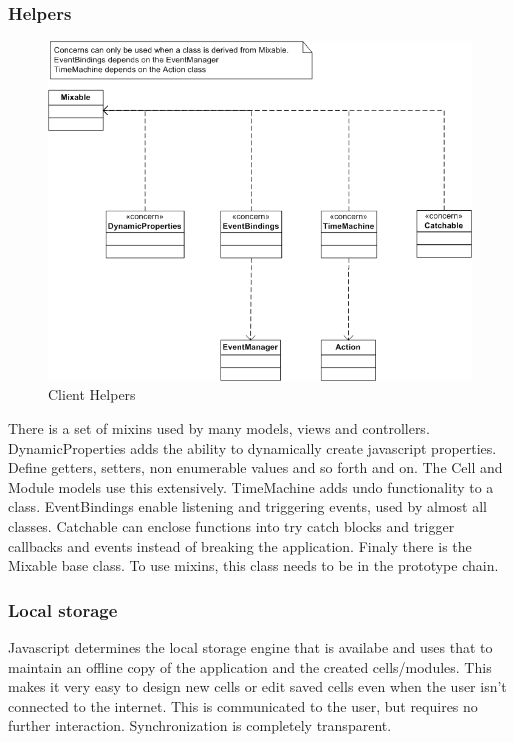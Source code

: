 \documentclass{report}
\begin{document}
				\subsubsection{Helpers}
					\begin{figure}[htb]
						\begin{center}
							\includegraphics[width=\linewidth]{helpers.png}
							\caption{Client Helpers}
							\label{fig: cmodels}
						\end{center}
					\end{figure}	
					There is a set of mixins used by many models, views and controllers. DynamicProperties adds the ability to dynamically create javascript properties. Define getters, setters, non enumerable values and so forth and on. The Cell and Module models use this extensively. TimeMachine adds undo functionality to a class. EventBindings enable listening and triggering events, used by almost all classes. Catchable can enclose functions into try catch blocks and trigger callbacks and events instead of breaking the application. Finaly there is the Mixable base class. To use mixins, this class needs to be in the prototype chain.
					
				\subsubsection{Local storage}
					Javascript determines the local storage engine that is availabe and uses that to maintain an offline copy of the application and the created cells/modules. This makes it very easy to design new cells or edit saved cells even when the user isn't connected to the internet. This is communicated to the user, but requires no further interaction. Synchronization is completely transparent.
		
\end{document}
